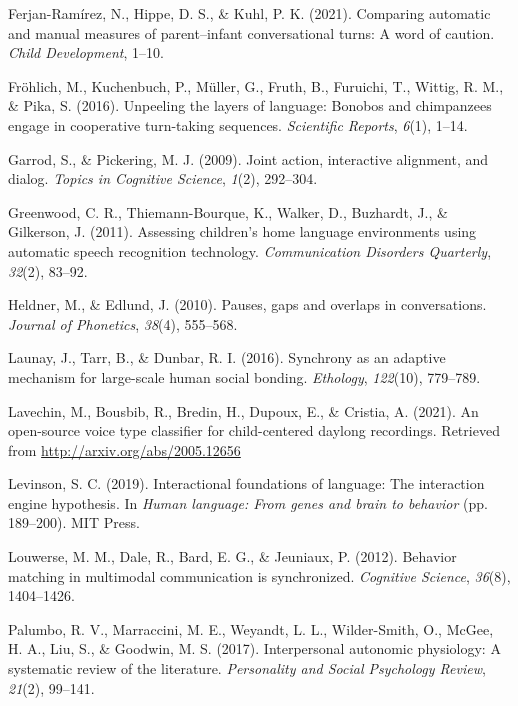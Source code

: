 \documentclass[10pt, letterpaper]{article}
\newenvironment{CSLReferences}%
  {}%
  {\par}
\begin{document}
\begin{CSLReferences}
\leavevmode\hypertarget{ref-ferjan2021comparing}{}%
Ferjan-Ramírez, N., Hippe, D. S., \& Kuhl, P. K. (2021). Comparing
automatic and manual measures of parent--infant conversational turns: A
word of caution. \emph{Child Development}, 1--10.

\leavevmode\hypertarget{ref-frohlich2016unpeeling}{}%
Fröhlich, M., Kuchenbuch, P., Müller, G., Fruth, B., Furuichi, T.,
Wittig, R. M., \& Pika, S. (2016). Unpeeling the layers of language:
Bonobos and chimpanzees engage in cooperative turn-taking sequences.
\emph{Scientific Reports}, \emph{6}(1), 1--14.

\leavevmode\hypertarget{ref-garrod2009joint}{}%
Garrod, S., \& Pickering, M. J. (2009). Joint action, interactive
alignment, and dialog. \emph{Topics in Cognitive Science}, \emph{1}(2),
292--304.

\leavevmode\hypertarget{ref-LENA}{}%
Greenwood, C. R., Thiemann-Bourque, K., Walker, D., Buzhardt, J., \&
Gilkerson, J. (2011). Assessing children's home language environments
using automatic speech recognition technology. \emph{Communication
Disorders Quarterly}, \emph{32}(2), 83--92.

\leavevmode\hypertarget{ref-heldner2010pauses}{}%
Heldner, M., \& Edlund, J. (2010). Pauses, gaps and overlaps in
conversations. \emph{Journal of Phonetics}, \emph{38}(4), 555--568.

\leavevmode\hypertarget{ref-launay2016synchrony}{}%
Launay, J., Tarr, B., \& Dunbar, R. I. (2016). Synchrony as an adaptive
mechanism for large-scale human social bonding. \emph{Ethology},
\emph{122}(10), 779--789.

\leavevmode\hypertarget{ref-lavechin2021vtc}{}%
Lavechin, M., Bousbib, R., Bredin, H., Dupoux, E., \& Cristia, A.
(2021). An open-source voice type classifier for child-centered daylong
recordings. Retrieved from \url{http://arxiv.org/abs/2005.12656}

\leavevmode\hypertarget{ref-levinson2019interactional}{}%
Levinson, S. C. (2019). Interactional foundations of language: The
interaction engine hypothesis. In \emph{Human language: From genes and
brain to behavior} (pp. 189--200). MIT Press.

\leavevmode\hypertarget{ref-louwerse2012behavior}{}%
Louwerse, M. M., Dale, R., Bard, E. G., \& Jeuniaux, P. (2012). Behavior
matching in multimodal communication is synchronized. \emph{Cognitive
Science}, \emph{36}(8), 1404--1426.

\leavevmode\hypertarget{ref-palumbo2017interpersonal}{}%
Palumbo, R. V., Marraccini, M. E., Weyandt, L. L., Wilder-Smith, O.,
McGee, H. A., Liu, S., \& Goodwin, M. S. (2017). Interpersonal autonomic
physiology: A systematic review of the literature. \emph{Personality and
Social Psychology Review}, \emph{21}(2), 99--141.


\end{CSLReferences}
\end{document}
